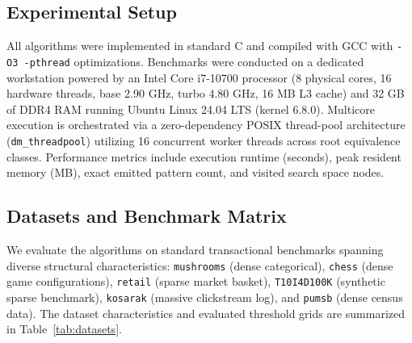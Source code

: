 \documentclass[runningheads,orivec]{llncs}
\begin{document}
\subsection{Experimental Setup}
All algorithms were implemented in standard C and compiled with GCC with \texttt{-O3 -pthread} optimizations. Benchmarks were conducted on a dedicated workstation powered by an Intel Core i7-10700 processor (8 physical cores, 16 hardware threads, base 2.90 GHz, turbo 4.80 GHz, 16 MB L3 cache) and 32 GB of DDR4 RAM running Ubuntu Linux 24.04 LTS (kernel 6.8.0). Multicore execution is orchestrated via a zero-dependency POSIX thread-pool architecture (\texttt{dm\_threadpool}) utilizing 16 concurrent worker threads across root equivalence classes. Performance metrics include execution runtime (seconds), peak resident memory (MB), exact emitted pattern count, and visited search space nodes.

\subsection{Datasets and Benchmark Matrix}
We evaluate the algorithms on standard transactional benchmarks spanning diverse structural characteristics: \texttt{mushrooms} (dense categorical), \texttt{chess} (dense game configurations), \texttt{retail} (sparse market basket), \texttt{T10I4D100K} (synthetic sparse benchmark), \texttt{kosarak} (massive clickstream log), and \texttt{pumsb} (dense census data). The dataset characteristics and evaluated threshold grids are summarized in Table~\ref{tab:datasets}.

\begin{table}[ht]
\centering
\caption{Characteristics of benchmark datasets and evaluated threshold ranges.}
\label{tab:datasets}
\end{table}
\end{document}
